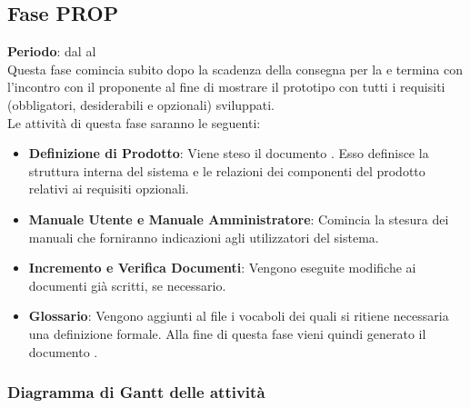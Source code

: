 \subsection{Fase PROP}
	\textbf{Periodo}: dal  al  \\Questa fase comincia subito dopo la scadenza della consegna per la  e termina con l'incontro con il proponente al fine di mostrare il prototipo con tutti i requisiti (obbligatori, desiderabili e opzionali) sviluppati. 
	\\Le attività di questa fase saranno le seguenti:
	\begin{itemize}
		\item\textbf{Definizione di Prodotto}: Viene steso il documento . Esso definisce la struttura interna del sistema e le relazioni dei componenti del prodotto relativi ai requisiti opzionali.
		\item\textbf{Manuale Utente e Manuale Amministratore}: Comincia la stesura dei manuali che forniranno indicazioni agli utilizzatori del sistema.
		\item\textbf{Incremento e Verifica Documenti}: Vengono eseguite modifiche ai documenti già scritti, se necessario.
		\item\textbf{Glossario}: Vengono aggiunti al file  i vocaboli dei quali si ritiene necessaria una definizione formale. Alla fine di questa fase vieni quindi generato il documento .
	\end{itemize}
	\subsubsection{Diagramma di Gantt delle attività}
